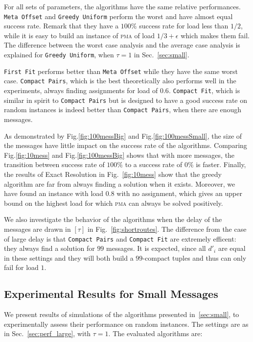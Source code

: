 \documentclass[a4paper,cleveref, autoref, thm-restate,UKenglish]{lipics-v2019}
\newcommand\pma{\textsc{pma}\xspace}
\newcommand\firstfit{\texttt{First Fit}\xspace}
\newcommand\compactpair{\texttt{Compact Pairs}\xspace}
\newcommand\metaoffset{\texttt{Meta Offset}\xspace}
\newcommand\greedyuniform{\texttt{Greedy Uniform}\xspace}
\newcommand\compactfit{\texttt{Compact Fit}\xspace}
\begin{document}
For all sets of parameters, the algorithms have the same relative performances. \metaoffset and \greedyuniform
perform the worst and have almost equal success rate. Remark that they have a $100\%$ success rate for load
less than $1/2$, while it is easy to build an instance of \pma of load $1/3 +\epsilon$ which makes them fail. 
The difference between the worst case analysis and the average case analysis is explained for \greedyuniform, when $\tau = 1$ in Sec.~\ref{sec:small}.

\firstfit performs better than \metaoffset while they have the same worst case. \compactpair, which is the best theoretically also performs well in the experiments, always finding assignments for load of 
$0.6$.  \compactfit, which is similar in spirit to \compactpair but is designed to have a good success rate on random instances is indeed better than  \compactpair, when there are enough messages.

As demonstrated by Fig.\ref{fig:100messBig} and Fig.\ref{fig:100messSmall}, the size of the messages have little impact on the success rate of the algorithms. Comparing Fig.\ref{fig:10mess} and Fig.\ref{fig:100messBig} shows that with more messages, the transition between success rate of $100\%$ to a success rate of $0\%$ is faster.
Finally, the results of Exact Resolution in Fig.~\ref{fig:10mess} show that the greedy algorithm are far from always finding a solution when it exists. Moreover, we have found an instance with load $0.8$ with no assignment, which gives an upper bound on the highest load for which \pma can always be solved positively.

We also investigate the behavior of the algorithms when the delay of the messages are drawn in $[\tau]$ in 
Fig.~\ref{fig:shortroutes}. The difference from the case of large delay is that \compactpair and \compactfit are extremely efficent: they always find a solution for $99$ messages. It is expected, since all $d'_i$ are equal in these settings and 
they will both build a $99$-compact tuples and thus can only fail for load $1$.

\subsection{Experimental Results for Small Messages} \label{sec:perf_small}


We present results of simulations of the algorithms presented in~\ref{sec:small}, to experimentally assess their performance on random instances. The settings are as in Sec.~\ref{sec:perf_large}, with $\tau = 1$.
The evaluated algorithms are:
\end{document}
